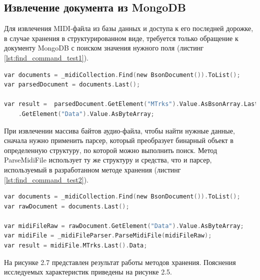 \subsection{Извлечение документа из MongoDB}

Для извлечения MIDI-файла из базы данных и доступа к его последней дорожке, в случае хранения в структурированном виде, требуется только обращение к документу MongoDB с поиском значения нужного поля (листинг \ref{lst:find_command_test1}). 

\newpage{}

\begin{lstlisting}[language=C, label=some-code, caption=Извлечение MIDI-файла из MongoDB c использованием реализованного метода, label=lst:find_command_test1]
var documents = _midiCollection.Find(new BsonDocument()).ToList();
var parsedDocument = documents.Last();

var result =  parsedDocument.GetElement("MTrks").Value.AsBsonArray.Last().AsBsonDocument
    .GetElement("Data").Value.AsByteArray;
\end{lstlisting}

При извлечении массива байтов аудио-файла, чтобы найти нужные данные, сначала нужно применить парсер, который преобразует бинарный объект в определенную структуру, по которой можно выполнить поиск. Метод ParseMidiFile использует ту же структуру и средства, что и парсер, используемый в разработанном методе хранения (листинг \ref{lst:find_command_test2}).

\begin{lstlisting}[language=C, label=some-code, caption=Извлечение MIDI-файла из MongoDB в виде массива байтов, label=lst:find_command_test2]
var documents = _midiCollection.Find(new BsonDocument()).ToList();
var rawDocument = documents.Last();

var midiFileRaw = rawDocument.GetElement("Data").Value.AsByteArray;
var midiFile = _midiFileParser.ParseMidiFile(midiFileRaw);
var result = midiFile.MTrks.Last().Data;
\end{lstlisting}

На рисунке 2.7 представлен результат работы методов хранения. Пояснения исследуемых характеристик приведены на рисунке 2.5.

